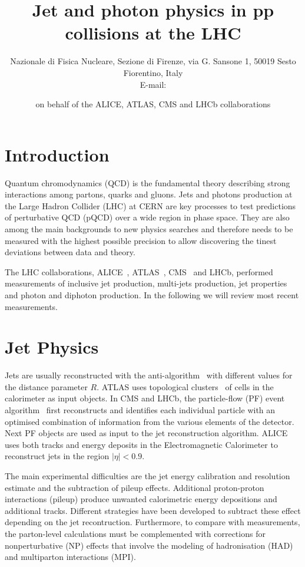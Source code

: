 \documentclass{PoS}
\title{Jet and photon physics in pp collisions at the LHC}
\author{\speaker{ Vitaliano Ciulli }%
Nazionale di Fisica Nucleare, Sezione di Firenze, via G. Sansone 1, 50019 Sesto Fiorentino, Italy \\ E-mail:
\email{vitaliano.ciulli@fi.infn.it}} \author{on behalf of the ALICE, ATLAS, CMS and LHCb collaborations}
\begin{document}
\section{Introduction}

Quantum chromodynamics (QCD) is the fundamental theory describing strong interactions among partons, \ie quarks and
gluons. Jets and photons production at the Large Hadron Collider (LHC) at CERN are key processes to test predictions of
perturbative QCD (pQCD) over a wide region in phase space. They are also among the main backgrounds to new physics
searches and therefore needs to be measured with the highest possible precision to allow discovering the tinest
deviations between data and theory.

The LHC collaborations, ALICE~, ATLAS~\cite{Aad:2008zzm}, CMS~\cite{Chatrchyan:2008aa} and LHCb, performed
measurements of inclusive jet production, multi-jets production, jet properties and photon and diphoton production. 
In the following we will review most recent measurements.

\section{Jet Physics}

Jets are usually reconstructed with the anti-\kts algorithm~\cite{Cacciari:2008gp} with different values for the distance parameter $R$.
ATLAS uses topological clusters~\cite{Lampl:2008zz} of cells in the calorimeter as input objects. 
In CMS and LHCb, the particle-flow (PF) event algorithm~\cite{CMS:2009nxa}
first reconstructs and identifies each individual particle with an optimised
combination of information from the various elements of the detector. Next PF objects are used as input to the jet
reconstruction algorithm. ALICE uses both tracks and energy deposits in the
Electromagnetic Calorimeter to reconstruct jets in the region $|\eta|<0.9$.

The main experimental difficulties are the jet energy calibration and resolution estimate and the subtraction of pileup
effects. Additional proton-proton interactions (pileup) produce unwanted calorimetric energy depositions and additional
tracks. Different strategies have been developed to subtract these effect depending on the jet recontruction.
Furthermore, to compare with measurements, the parton-level calculations must be complemented with corrections for nonperturbative
(NP) effects that involve the modeling of hadronisation (HAD) and multiparton interactions (MPI).
\end{document}
